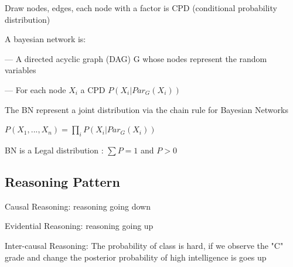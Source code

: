 \documentclass{book}
\begin{document}
Draw nodes, edges, each node with a factor is CPD (conditional probability distribution)

A bayesian network is:

--- A directed acyclic graph (DAG) G whose nodes represent the random variables

--- For each node $X_i$ a CPD $P(X_i|Par_G(X_i))$

The BN represent a joint distribution via the chain rule for Bayesian Networks

$P(X_1,...,X_n) = \prod_{i} P(X_i|Par_G(X_i))$

BN is a Legal distribution : $\sum P=1$ and $P>0$

\subsection{Reasoning Pattern}
Causal Reasoning: reasoning going down

Evidential Reasoning: reasoning going up

Inter-causal Reasoning: The probability of class is hard, if we observe the "C" grade and change the posterior probability of high intelligence is goes up










 
\end{document}
